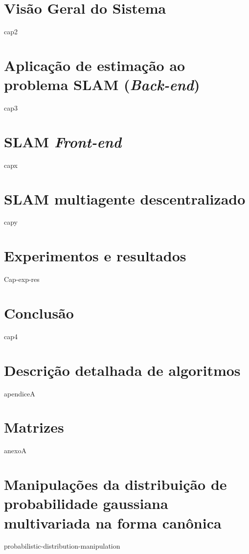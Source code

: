 \documentclass[msc, dv]{ita}
\begin{document}
\chapter{Visão Geral do Sistema}
{cap2}

\chapter{Aplicação de estimação ao problema SLAM (\textit{Back-end})}
\label{ch:back-end}
{cap3}

\chapter{SLAM \textit{Front-end}}
{capx}

\chapter{SLAM multiagente descentralizado}
{capy}

\chapter{Experimentos e resultados}
{Cap-exp-res}

\chapter{Conclusão}
{cap4}

\renewcommand\bibname{\itareferencesnamebabel} %


\appendix
\chapter{Descrição detalhada de algoritmos}
{apendiceA}

\annex
\chapter{Matrizes}
{anexoA}

\chapter{Manipulações da distribuição de probabilidade gaussiana multivariada na forma canônica}
\label{annex:info-gaussian-manipulation}
{probabilistic-distribution-manipulation}
\end{document}
